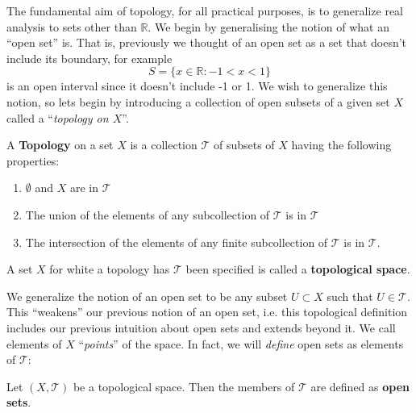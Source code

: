 \begin{prob}
The fundamental aim of topology, for all practical purposes, is
to generalize real analysis to sets other than $\mathbb{R}$. We
begin by generalising the notion of what an ``open set'' is. That
is, previously we thought of an open set as a set that doesn't
include its boundary, for example
\begin{equation}
S = \{x\in\mathbb{R}: -1<x<1\}
\end{equation}
is an open interval since it doesn't include -1 or 1. We wish to
generalize this notion, so lets begin by introducing a collection
of open subsets of a given set $X$ called a ``\emph{topology on $X$}''.
\end{prob}

\begin{defn}\label{defn:topology}
A \textbf{Topology} on a set $X$ is a collection $\mathcal{T}$ of
subsets of $X$ having the following properties:
\begin{enumerate}
\item $\emptyset$ and $X$ are in $\mathcal{T}$
\item The union of the elements of any subcollection of
  $\mathcal{T}$ is in $\mathcal{T}$
\item The intersection of the elements of any finite
  subcollection of $\mathcal{T}$ is in $\mathcal{T}$.
\end{enumerate}
A set $X$ for white a topology has $\mathcal{T}$ been specified
is called a \textbf{topological space}.
\end{defn}

We generalize the notion of an open set to be any subset
$U\subset X$ such that $U\in\mathcal{T}$. This ``weakens'' our
previous notion of an open set, i.e. this topological definition
includes our previous intuition about open sets and extends
beyond it. We call elements of $X$ ``\emph{points}'' of the
space. In fact, we will \emph{define} open sets as elements of
$\mathcal{T}$:

\begin{defn}\label{defn:openSets}
  Let $(X,\mathcal{T})$ be a topological space. Then the members
  of $\mathcal{T}$ are defined as \textbf{open sets}.
\end{defn}

